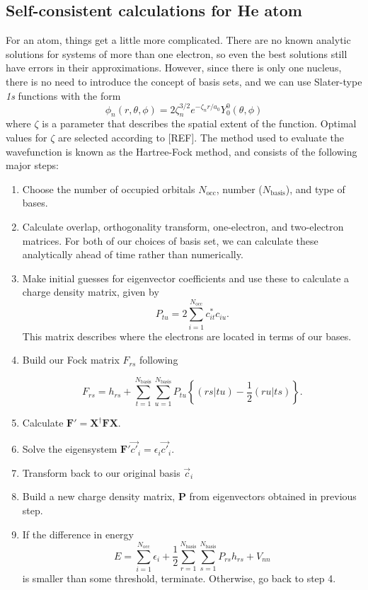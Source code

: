 \documentclass[journal=jacsat,manuscript=communication]{achemso}
\newcommand{\matr}[1]{\mathbf{#1}}
\begin{document}
\subsection{Self-consistent calculations for He atom}
For an  atom, things get a little more complicated.  There are no known analytic solutions for systems of more than one electron, so even the best solutions still have errors in their approximations.  However, since there is only one nucleus, there is no need to introduce the concept of basis sets, and we can use Slater-type \textit{1s} functions with the form 
\begin{equation}
	\phi_n(r,\theta,\phi) = 2\zeta_n^{3/2}e^{-\zeta_nr/a_0}Y_0^0(\theta,\phi)
\end{equation}
where $\zeta$ is a parameter that describes the spatial extent of the function.  Optimal values for $\zeta$ are selected according to [REF].  The method used to evaluate the wavefunction is known as the Hartree-Fock method, and consists of the following major steps:
\begin{enumerate}
	\item Choose the number of occupied orbitals $N_\mathrm{occ}$, number ($N_\mathrm{basis}$), and type of bases.
	\item Calculate overlap, orthogonality transform, one-electron, and two-electron matrices.  For both of our choices of basis set, we can calculate these analytically ahead of time rather than numerically.
	\item Make initial guesses for eigenvector coefficients and use these to calculate a charge density matrix, given by
\begin{equation}
	P_{tu} = 2 \sum_{i=1}^{N_{\mathrm{occ}}}c^*_{it}c_{iu}.
\end{equation}
	This matrix describes where the electrons are located in terms of our bases.
	\item Build our Fock matrix $F_{rs}$ following

\begin{equation}
	F_{rs} = h_{rs} + \sum_{t=1}^{N_\mathrm{basis}}\sum_{u=1}^{N_\mathrm{basis}}P_{tu}\left\{(rs|tu) -\frac{1}{2}(ru|ts)\right\}.
\end{equation}
	\item Calculate $\matr{F}' = \matr{X}^\dag\matr{F}\matr{X}$.
	\item Solve the eigensystem $\matr{F}'\vec{c'}_i=\epsilon_i\vec{c'}_i$.
	\item Transform back to our original basis $\vec{c}_i$
	\item Build a new charge density matrix, $\matr{P}$ from eigenvectors obtained in previous step.
	\item If the difference in energy 
\begin{equation}
	E = \sum_{i=1}^{N_\mathrm{occ}}\epsilon_i + \frac{1}{2} \sum_{r=1}^{N_\mathrm{basis}} \sum_{s=1}^{N_\mathrm{basis}}P_{rs}h_{rs}+V_{nn}
	\label{eq:hf_energy}
\end{equation}
is smaller than some threshold, terminate.  Otherwise, go back to step 4.
\end{enumerate}
\end{document}
